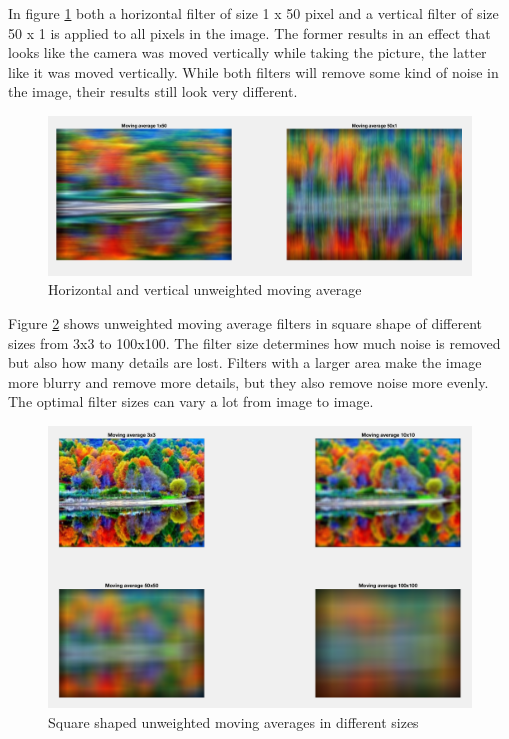 In figure \ref{fig:task9} both a horizontal filter of size 1 x 50 pixel and a vertical filter of size 50 x 1 is applied to all pixels in the image. The former results in an effect that looks like the camera was moved vertically while taking the picture, the latter like it was moved vertically. While both filters will remove some kind of noise in the image, their results still look very different. 

\begin{figure}[!hbt]
  \includegraphics[width=\textwidth]{./img/task9.png}
  \caption{Horizontal and vertical unweighted moving average}
  \label{fig:task9}
\end{figure}

Figure \ref{fig:task10} shows unweighted moving average filters in square shape of different sizes from 3x3 to 100x100. The filter size determines how much noise is removed but also how many details are lost. Filters with a larger area make the image more blurry and remove more details, but they also remove noise more evenly. The optimal filter sizes can vary a lot from image to image.

\begin{figure}[!hbt]
  \includegraphics[width=\textwidth]{./img/task10.png}
  \caption{Square shaped unweighted moving averages in different sizes}
  \label{fig:task10}
\end{figure}

